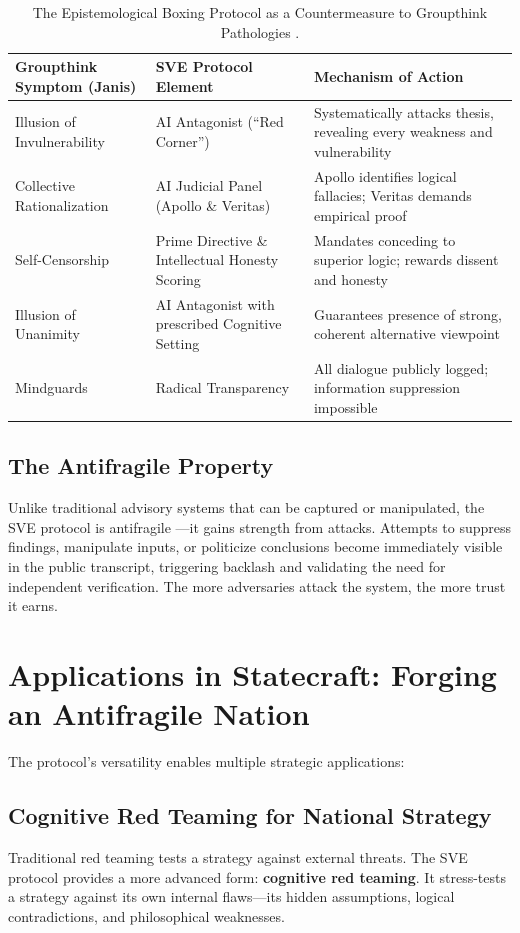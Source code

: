 \documentclass[11pt,a4paper]{article}
\begin{document}
\begin{table}[h!]
\centering
\caption{The Epistemological Boxing Protocol as a Countermeasure to Groupthink Pathologies \citep{AnalyticalReport2025}.}
\label{tab:groupthink_antidote}
\begin{tabular}{@{}p{4.5cm}p{4.5cm}p{5cm}@{}}
\toprule
\textbf{Groupthink Symptom (Janis)} & \textbf{SVE Protocol Element} & \textbf{Mechanism of Action} \\ 
\midrule
Illusion of Invulnerability & AI Antagonist (``Red Corner'') & Systematically attacks thesis, revealing every weakness and vulnerability \\
\addlinespace
Collective Rationalization & AI Judicial Panel (Apollo \& Veritas) & Apollo identifies logical fallacies; Veritas demands empirical proof \\
\addlinespace
Self-Censorship & Prime Directive \& Intellectual Honesty Scoring & Mandates conceding to superior logic; rewards dissent and honesty \\
\addlinespace
Illusion of Unanimity & AI Antagonist with prescribed Cognitive Setting & Guarantees presence of strong, coherent alternative viewpoint \\
\addlinespace
Mindguards & Radical Transparency & All dialogue publicly logged; information suppression impossible \\
\bottomrule
\end{tabular}
\end{table}

\subsection{The Antifragile Property}
Unlike traditional advisory systems that can be captured or manipulated, the SVE protocol is antifragile \citep{Taleb2012}—it gains strength from attacks. Attempts to suppress findings, manipulate inputs, or politicize conclusions become immediately visible in the public transcript, triggering backlash and validating the need for independent verification. The more adversaries attack the system, the more trust it earns.

\section{Applications in Statecraft: Forging an Antifragile Nation}
The protocol's versatility enables multiple strategic applications:

\subsection{Cognitive Red Teaming for National Strategy}
Traditional red teaming tests a strategy against external threats. The SVE protocol provides a more advanced form: \textbf{cognitive red teaming}. It stress-tests a strategy against its own internal flaws—its hidden assumptions, logical contradictions, and philosophical weaknesses.
\end{document}
